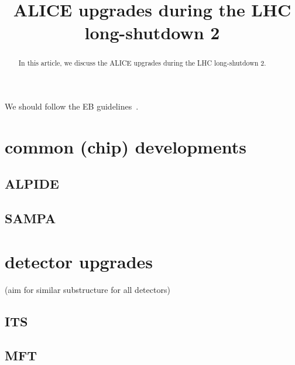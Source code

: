 \documentclass[ALICE,manyauthors]{cernphprep}
\begin{document}
\begin{titlepage}

\title{ALICE upgrades during the LHC long-shutdown 2}


\begin{abstract}
In this article, we discuss the ALICE upgrades during the LHC long-shutdown 2.
\end{abstract}
\end{titlepage}

\setcounter{page}{2} %

\tableofcontents
\listoffigures

We should follow the EB guidelines~\cite{EBGuidelineEditing}.





\section{common (chip) developments}
\subsection{ALPIDE}
\subsection{SAMPA}

\section{detector upgrades}
(aim for similar substructure for all detectors)
\subsection{ITS}
\subsection{MFT}
\end{document}
